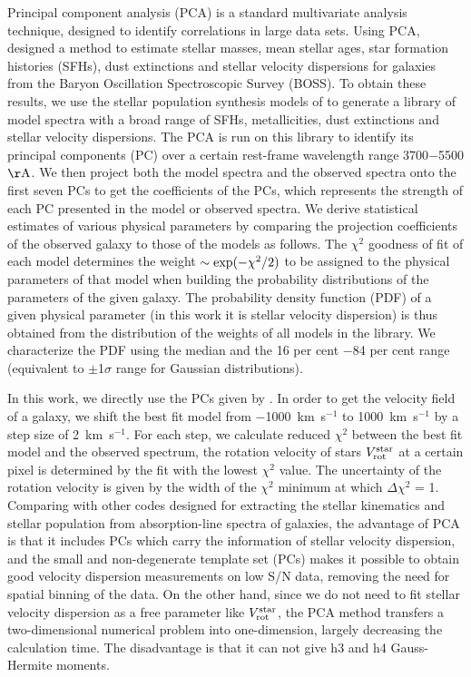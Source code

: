 \documentclass[a4paper,fleqn,usenatbib]{mnras}
\begin{document}
Principal component analysis (PCA) is a standard multivariate
analysis technique, designed to identify correlations in large data
sets. Using PCA, \cite{chen-2012} designed a method to estimate stellar masses, 
mean stellar ages, star formation histories (SFHs), dust extinctions and stellar velocity dispersions 
for galaxies from the Baryon Oscillation Spectroscopic Survey (BOSS). 
To obtain these results, we use the stellar population synthesis models 
of \cite[BC03]{bc03} to generate a library of model spectra with a broad range of SFHs,
metallicities, dust extinctions and stellar velocity dispersions. The PCA is run on this library
to identify its principal components (PC) over a certain rest-frame wavelength range 3700$-$5500$\rm \AA$. 
We then project both the model spectra and the observed spectra onto the first seven PCs to 
get the coefficients of the PCs, which represents the strength of each PC presented in the model or observed 
spectra. We derive statistical estimates of various physical parameters
by comparing the projection coefficients of the observed galaxy to those of the models as follows.
The $\chi^2$ goodness  of  fit  of  each  model  determines  the
weight $\sim {\rm exp(-\chi^2/2)}$ to be assigned to the physical parameters of that model when building the probability distributions
of the parameters of the given galaxy. The probability density
function (PDF) of a given physical parameter (in this work it is stellar velocity dispersion) is thus obtained
from the distribution of the weights of all models in the library.
We characterize the PDF using the median and the 16 per cent $-$84 per cent
range  (equivalent  to $\pm$1$\sigma$ range  for  Gaussian distributions).

In this work, we directly use the PCs given by \cite{chen-2012}. 
In order to get the velocity field of a galaxy, we shift the best fit model from $-$1000~km~s$^{-1}$ to 1000~km~s$^{-1}$ by a step size 
of 2~km~s$^{-1}$. For each step, we calculate reduced $\chi^2$ between the best fit model and the observed spectrum, the rotation velocity 
of stars $V_{\rm rot}^{\rm star}$ at a certain pixel is determined by the fit with the lowest $\chi^2$ value. The uncertainty of the 
rotation velocity is given by the width of the $\chi^2$ minimum at which $\Delta\chi^2$ = 1. Comparing with other codes \citep[e.g. pPXF,][]{ppxf} 
designed for extracting the stellar kinematics and stellar population from  absorption-line spectra of galaxies, 
the advantage of PCA is that it includes PCs which carry the 
information of stellar velocity dispersion, 
and the small and non-degenerate template set (PCs) makes it possible to obtain good
velocity dispersion measurements on low S/N data, removing the need for spatial binning of the data.
On the other hand, since we do not need to fit stellar velocity dispersion as a free parameter
like $V_{\rm rot}^{\rm star}$, the PCA method transfers a two-dimensional numerical problem into one-dimension, largely 
decreasing the calculation time. The disadvantage is that it can not give h3 and h4 Gauss-Hermite moments.
\end{document}
